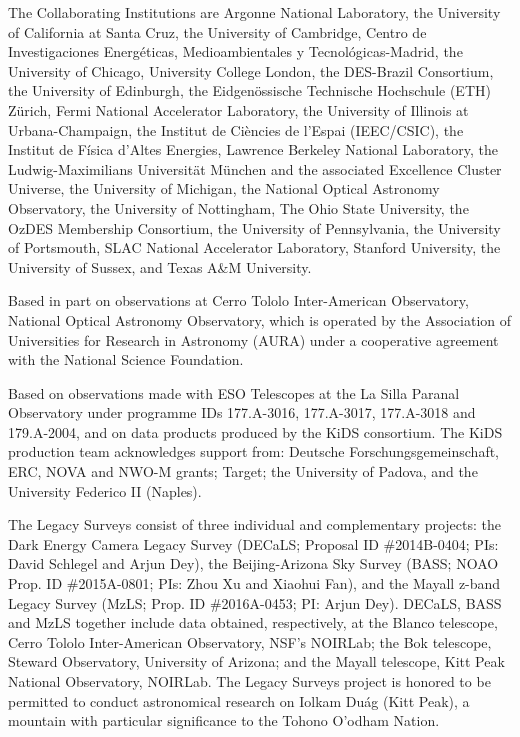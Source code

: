 \documentclass[a4paper,11pt]{article}
\begin{document}
    The Collaborating Institutions are Argonne National Laboratory, the University of California at Santa Cruz, the University of Cambridge, Centro de Investigaciones Energ{\'e}ticas, Medioambientales y Tecnol{\'o}gicas-Madrid, the University of Chicago, University College London, the DES-Brazil Consortium, the University of Edinburgh, the Eidgen{\"o}ssische Technische Hochschule (ETH) Z{\"u}rich,  Fermi National Accelerator Laboratory, the University of Illinois at Urbana-Champaign, the Institut de Ci{\`e}ncies de l'Espai (IEEC/CSIC), the Institut de F{\'i}sica d'Altes Energies, Lawrence Berkeley National Laboratory, the Ludwig-Maximilians Universit{\"a}t M{\"u}nchen and the associated Excellence Cluster Universe, the University of Michigan, the National Optical Astronomy Observatory, the University of Nottingham, The Ohio State University, the OzDES Membership Consortium, the University of Pennsylvania, the University of Portsmouth, SLAC National Accelerator Laboratory, Stanford University, the University of Sussex, and Texas A\&M University.
    
    Based in part on observations at Cerro Tololo Inter-American Observatory, National Optical Astronomy Observatory, which is operated by the Association of Universities for Research in Astronomy (AURA) under a cooperative agreement with the National Science Foundation.
    
    Based on observations made with ESO Telescopes at the La Silla Paranal Observatory under programme IDs 177.A-3016, 177.A-3017, 177.A-3018 and 179.A-2004, and on data products produced by the KiDS consortium. The KiDS production team acknowledges support from: Deutsche Forschungsgemeinschaft, ERC, NOVA and NWO-M grants; Target; the University of Padova, and the University Federico II (Naples).
    
    The Legacy Surveys consist of three individual and complementary projects: the Dark Energy Camera Legacy Survey (DECaLS; Proposal ID \#2014B-0404; PIs: David Schlegel and Arjun Dey), the Beijing-Arizona Sky Survey (BASS; NOAO Prop. ID \#2015A-0801; PIs: Zhou Xu and Xiaohui Fan), and the Mayall z-band Legacy Survey (MzLS; Prop. ID \#2016A-0453; PI: Arjun Dey). DECaLS, BASS and MzLS together include data obtained, respectively, at the Blanco telescope, Cerro Tololo Inter-American Observatory, NSF's NOIRLab; the Bok telescope, Steward Observatory, University of Arizona; and the Mayall telescope, Kitt Peak National Observatory, NOIRLab. The Legacy Surveys project is honored to be permitted to conduct astronomical research on Iolkam Du\'ag (Kitt Peak), a mountain with particular significance to the Tohono O’odham Nation.
\end{document}
